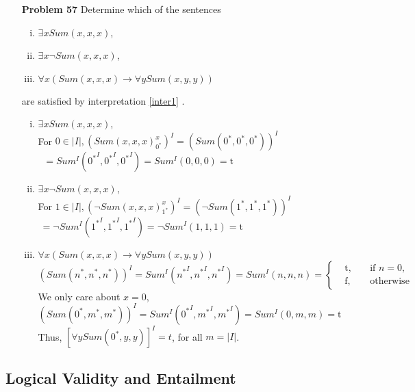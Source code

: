 \begin{enumerate}
\item[\textbf{Problem 57}] Determine which of the sentences
\begin{enumerate}[(i)]
    \item $\exists x Sum(x, x, x)$,
    \item $\exists x \neg Sum(x, x, x)$, 
    \item $\forall x (Sum(x,x,x) \rightarrow \forall y Sum(x, y, y))$
\end{enumerate}
are satisfied by interpretation \eqref{inter1} . 


\begin{enumerate}[(i)]
    \item $\exists x Sum(x, x, x)$,  \\
       For $0 \in |I|, (Sum(x, x, x)^{x}_{0^*})^I = (Sum(0^*, 0^*, 0^*))^I$ \\
               $~$\hspace{51.4mm}                      $= Sum^I({0^*}^I,{0^*}^I,{0^*}^I) = Sum^I(0,0,0) = \mathrm{t}$ 
    \\
    \item $\exists x \neg Sum(x, x, x)$, \\
    For $1 \in |I|, (\neg Sum(x, x, x)^x_{1^*})^I = (\neg Sum(1^*, 1^*, 1^*))^I$ \\
             $~$\hspace{55.4mm}$ =\neg Sum^I({1^*}^I,{1^*}^I,{1^*}^I) = \neg Sum^I(1,1,1) = \mathrm{t}$ 
    \\
    \item $\forall x (Sum(x,x,x) \rightarrow \forall y Sum(x, y, y))$\\
    $(Sum(n^*, n^*, n^*))^I = Sum^I({n^*}^I,{n^*}^I,{n^*}^I) = Sum^I(n, n, n) = 
    \left\{
        \begin{array}{ccc}      
        &\mathrm{t}, \quad &\text{if }  n = 0, \\
        &\mathrm{f}, \quad &\text{otherwise}
        \end{array}\right.    $
    We only care about $x = 0$, \\
    $(Sum(0^*, m^*, m^*))^I = Sum^I({0^*}^I,{m^*}^I,{m^*}^I) = Sum^I(0, m, m) = \mathrm{t}$  \\
    Thus, $[\forall y Sum(0^*, y, y)]^I = t$, for all $m = |I|$. 
\end{enumerate}
\end{enumerate}


\newpage

\subsection{Logical Validity and Entailment}

